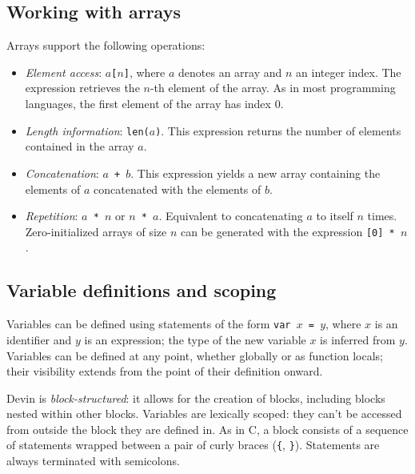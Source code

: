 \documentclass[UdineBachThesis,american,11pt]{PhdThesis}
\begin{document}
  \newpage

  \subsection{Working with arrays}

  Arrays support the following operations:

  \begin{itemize}
    \item \emph{Element access}: \mbox{\texttt{$a$[$n$]}}, where $a$ denotes an
    array and $n$ an integer index. The expression retrieves the $n$-th element
    of the array. As in most programming languages, the first element of the
    array has index $0$.

    \item \emph{Length information}: \mbox{\texttt{len($a$)}}. This expression
    returns the number of elements contained in the array $a$.

    \item \emph{Concatenation}: \mbox{\texttt{$a$ + $b$}}. This expression
    yields a new array containing the elements of $a$ concatenated with the
    elements of $b$.

    \item \emph{Repetition}: \mbox{\texttt{$a$ * $n$}} or
    \mbox{\texttt{$n$ * $a$}}. Equivalent to concatenating $a$ to itself $n$
    times. \\
    Zero-initialized arrays of size $n$ can be generated with the expression
    \mbox{\texttt{[0] * $n$}}.
  \end{itemize}

  \subsection{Variable definitions and scoping}

  Variables can be defined using statements of the form
  \mbox{\texttt{var $x$ = $y$}}, where $x$ is an identifier and $y$ is an
  expression; the type of the new variable $x$ is inferred from $y$. Variables
  can be defined at any point, whether globally or as function locals; their
  visibility extends from the point of their definition onward.

  Devin is \emph{block-structured}: it allows for the creation of blocks,
  including blocks nested within other blocks. Variables are lexically scoped:
  they can't be accessed from outside the block they are defined in. As in C, a
  block consists of a sequence of statements wrapped between a pair of curly
  braces (\texttt{\{}, \texttt{\}}). Statements are always terminated with
  semicolons.
\end{document}
